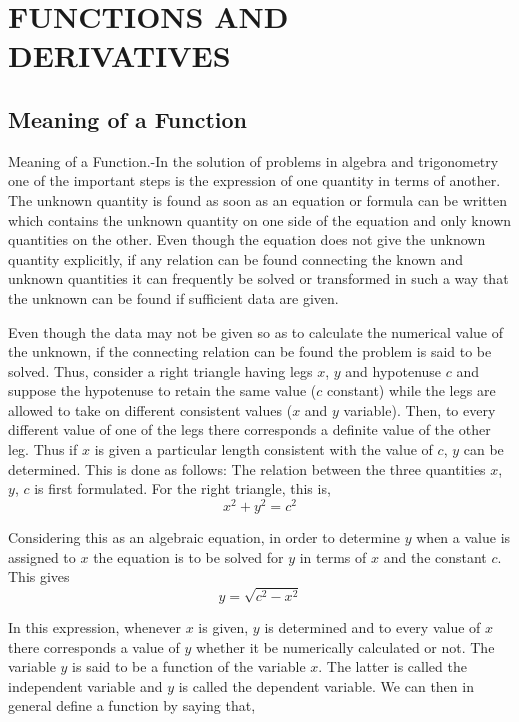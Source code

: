 
\chapter{FUNCTIONS AND DERIVATIVES}

\section{Meaning of a Function}
Meaning of a Function.-In the solution of problems in algebra and trigonometry one of the important steps is the expression of one quantity in terms of another. The unknown quantity is found as soon as an equation or formula can be written which contains the unknown quantity on one side of the equation and only known quantities on the other. Even though the equation does not give the unknown quantity explicitly, if any relation can be found connecting the known and unknown quantities it can frequently be solved or transformed in such a way that the unknown can be found if sufficient data are given.

Even though the data may not be given so as to calculate the numerical value of the unknown, if the connecting relation can be found the problem is said to be solved. Thus, consider a right triangle having legs $x$, $y$ and hypotenuse $c$ and suppose the hypotenuse to retain the same value ($c$ constant) while the legs are allowed to take on different consistent values ($x$ and $y$ variable). Then, to every different value of one of the legs there corresponds a definite value of the other leg. Thus if $x$ is given a particular length consistent with the value of $c$, $y$ can be determined. This is done as follows: The relation between the three quantities $x$, $y$, $c$ is first formulated. For the right triangle, this is,
\[x^2 + y^2 = c^2 \tag{10} \label{10}\]

Considering this as an algebraic equation, in order to determine $y$ when a value is assigned to $x$ the equation is to be solved for $y$ in terms of $x$ and the constant $c$. This gives
\[y = \sqrt{c^2 - x^2} \tag{11} \label{11}\]

In this expression, whenever $x$ is given, $y$ is determined and to every value of $x$ there corresponds a value of $y$ whether it be numerically calculated or not. The variable $y$ is said to be a function of the variable $x$. The latter is called the independent variable and $y$ is called the dependent variable. We can then in general define a function by saying that,

